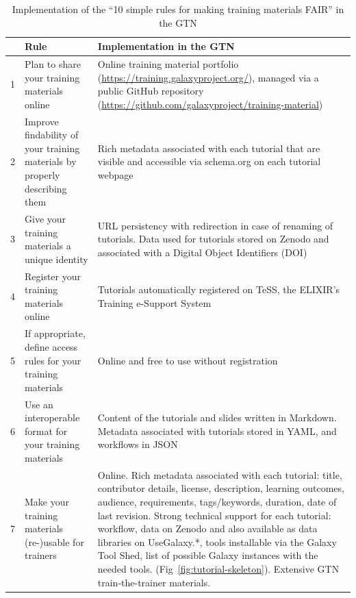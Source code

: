 \begin{table}[h!t]
    \captionsetup{margin=-2in}
    \caption{Implementation of the ``10 simple rules for making training materials FAIR'' \cite{Garcia2020} in the GTN}
    \label{S2_Table}
	\centering
	\begin{tabular}{|l|p{}|p{}|}
	    \hline \rule{0pt}{3.6ex}
		& \textbf{Rule}                                                                & \textbf{Implementation in the GTN}\\
		
		\hline \rule{0pt}{3.6ex}
		
		1 & Plan to share your training materials online                                  & Online training material portfolio (\url{https://training.galaxyproject.org/}), managed via a public GitHub repository (\url{https://github.com/galaxyproject/training-material})\\
		
		\rule{0pt}{3.6ex}
		2 & Improve findability of your training materials by properly describing them    & Rich metadata associated with each tutorial that are visible and accessible via schema.org on each tutorial webpage\\
		
		\rule{0pt}{3.6ex}
		3 & Give your training materials a unique identity                                & URL persistency with redirection in case of renaming of tutorials.
		Data used for tutorials stored on Zenodo and associated with a Digital Object Identifiers (DOI) \\
		
		\rule{0pt}{3.6ex}
		4 & Register your training materials online                                       & Tutorials automatically registered on TeSS, the ELIXIR's Training e-Support System \cite{tess}  \\
		
		\rule{0pt}{3.6ex}
        5 & If appropriate, define access rules for your training materials               &	Online and free to use without registration \\
        
        \rule{0pt}{3.6ex}
        6 & Use an interoperable format for your training materials                       &	Content of the tutorials and slides written in Markdown. Metadata associated with tutorials stored in YAML, and workflows in JSON\\
        
        \rule{0pt}{3.6ex}
        7 & Make your training materials (re-)usable for trainers                          & Online. Rich metadata associated with each tutorial: title, contributor details, license, description, learning outcomes, audience, requirements, tags/keywords, duration, date of last revision. Strong technical support for each tutorial: workflow, data on Zenodo and also available as data libraries on UseGalaxy.*, tools installable via the Galaxy Tool Shed, list of possible Galaxy instances with the needed tools. (Fig~\ref{fig:tutorial-skeleton}). Extensive GTN train-the-trainer materials.\\
        

\end{tabular}
\end{table}
